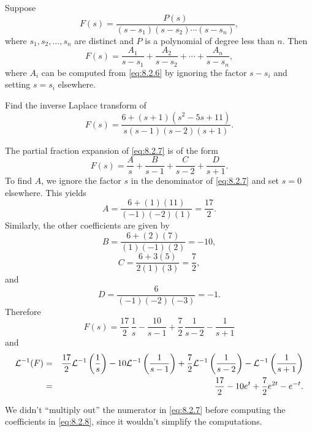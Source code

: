 \documentclass{ximera}
\begin{document}
\begin{theorem}\label{thmtype:8.2.2}
Suppose
\begin{equation}\label{eq:8.2.6}
F(s)=\frac{P(s)}{(s-s_1)(s-s_2)\cdots(s-s_n)},
\end{equation}
where $s_1, s_2, \dots, s_n$ are distinct  and $P$ is a polynomial of
degree less than $n$.  Then
$$
F(s)=\frac{A_1}{s-s_1}+\frac{A_2}{s-s_2}+\cdots+\frac{A_n}{s-s_n},$$
where $A_i$ can be computed from \eqref{eq:8.2.6}
by ignoring the factor $s-s_i$ and setting $s=s_i$ elsewhere.
\end{theorem}

\begin{example}\label{example:8.2.5} Find the inverse Laplace transform
of
\begin{equation}\label{eq:8.2.7}
F(s)=\frac{6+(s+1)(s^2-5s+11)}{s(s-1)(s-2)(s+1)}.
\end{equation}
\begin{explanation}
The partial fraction expansion of  \eqref{eq:8.2.7} is of the form
\begin{equation}\label{eq:8.2.8}
F(s)=\frac{A}{s}+\frac{B}{s-1}+\frac{C}{s-2}+\frac{D}{s+1}.
\end{equation}
To find $A$, we ignore the factor $s$ in the denominator of
\eqref{eq:8.2.7} and set $s=0$ elsewhere. This yields
$$
A=\frac{6+(1)(11)}{(-1)(-2)(1)}=\frac{17}{2}.
$$
Similarly, the other coefficients are given by
$$
B=\frac{6+(2)(7)}{(1)(-1)(2)}=-10,
$$
$$
C=\frac{6+3(5)}{2(1)(3)}=\frac{7}{2},
$$
and
$$
D=\frac{6}{(-1)(-2)(-3)}=-1.
$$
Therefore
$$
F(s)=\frac{17}{2}\,\frac{1}{s}-\frac{10}{s-1}+\frac{7}{2}\,\frac{1}{s-2}-\frac{1}{s+1}
$$
and
\begin{eqnarray*}
{\cal L}^{-1}(F)&=&
 \frac{17}{2}{\cal L}^{-1}\left(\frac{1}{s}\right)-10{\cal L}^{-1}\left(\frac{1}{s-1}\right)+\frac{7}{2}{\cal L}^{-1}\left(\frac{1}{s-2}\right)-{\cal L}^{-1}\left(\frac{1}{s+1}\right)\\
&=& \frac{17}{2}-10e^t+\frac{7}{2}e^{2t}-e^{-t}.
\end{eqnarray*}
\end{explanation}
\end{example}

\begin{remark}
We didn't ``multiply out'' the numerator in
\eqref{eq:8.2.7} before
computing the coefficients in \eqref{eq:8.2.8}, since
 it wouldn't simplify the computations.
\end{remark}
\end{document}
